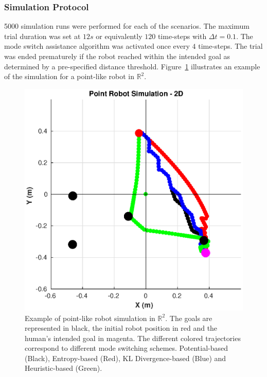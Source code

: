 \documentclass[conference]{IEEEtran}
\begin{document}
\subsubsection{Simulation Protocol}
5000 simulation runs were performed for each of the scenarios. 
The maximum trial duration was set at $12s$ or equivalently $120$ time-steps with $\Delta t = 0.1$. The mode switch assistance algorithm was activated once every $4$ time-steps. The trial was ended prematurely if the robot reached within the intended goal as determined by a pre-specified distance threshold. Figure~\ref{fig:ws_sim} illustrates an example of the simulation for a point-like robot in $\mathbb{R}^2$. 
 \begin{figure}[h!]
	\centering
	\includegraphics[width= 0.8\hsize, height=0.43\vsize]{./figures/WS_SIM.eps}
	\vspace{-0.35cm}
	\caption{Example of point-like robot simulation in $\mathbb{R}^2$. The goals are represented in black, the initial robot position in red and the human's intended goal in magenta. The different colored trajectories correspond to different mode switching schemes. Potential-based (Black), Entropy-based (Red), KL Divergence-based (Blue) and Heuristic-based (Green).} 
	\label{fig:ws_sim}
\end{figure}
\end{document}
